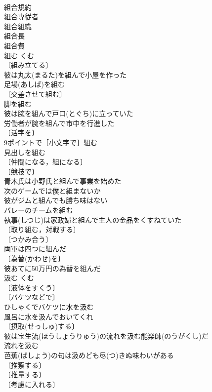 \documentclass[8pt]{extreport}
\begin{document}
\begin{CJK}{UTF8}{min}
\\	組合規約 
\\	組合専従者 
\\	組合組織 
\\	組合長 
\\	組合費 
\\	組む	くむ	
\\	〔組み立てる〕
\\	彼は丸太(まるた)を組んで小屋を作った 
\\	足場(あしば)を組む 
\\	〔交差させて組む〕
\\	脚を組む 
\\	彼は腕を組んで戸口(とぐち)に立っていた 
\\	労働者が腕を組んで市中を行進した 
\\	〔活字を〕
\\	9ポイントで［小文字で］組む 
\\	見出しを組む 
\\	〔仲間になる，組になる〕
\\	〔競技で〕
\\	青木氏は小野氏と組んで事業を始めた 
\\	次のゲームでは僕と組まないか 
\\	彼がジムと組んでも勝ち味はない 
\\	バレーのチームを組む 
\\	執事(しつじ)は家政婦と組んで主人の金品をくすねていた 
\\	〔取り組む，対戦する〕
\\	〔つかみ合う〕
\\	両軍は四つに組んだ 
\\	〔為替(かわせ)を〕
\\	彼あてに50万円の為替を組んだ 
\\	汲む	くむ	
\\	〔液体をすくう〕
\\	〔バケツなどで〕
\\	ひしゃくでバケツに水を汲む 
\\	風呂に水を汲んでおいてくれ 
\\	〔摂取(せっしゅ)する〕
\\	彼は宝生流(ほうしょうりゅう)の流れを汲む能楽師(のうがくし)だ 
\\	流れを汲む 
\\	芭蕉(ばしょう)の句は汲めども尽(つ)きぬ味わいがある 
\\	〔推察する〕
\\	〔推量する〕
\\	〔考慮に入れる〕

\end{CJK}
\end{document}
